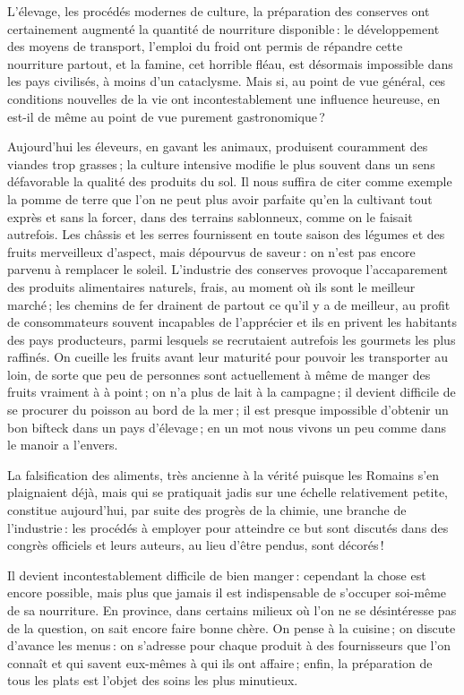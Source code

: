 L'élevage, les procédés modernes de culture, la préparation des conserves ont
certainement augmenté la quantité de nourriture disponible : le développement
des moyens de transport, l'emploi du froid ont permis de répandre cette
nourriture partout, et la famine, cet horrible fléau, est désormais impossible
dans les pays civilisés, à moins d'un cataclysme. Mais si, au point de vue
général, ces conditions nouvelles de la vie ont incontestablement une influence
heureuse, en est-il de même au point de vue purement gastronomique ?

Aujourd'hui les éleveurs, en gavant les animaux, produisent couramment des
viandes trop grasses ; la culture intensive modifie le plus souvent dans un
sens défavorable la qualité des produits du sol. Il nous suffira de citer comme
exemple la pomme de terre que l'on ne peut plus avoir parfaite qu'en la
cultivant tout exprès et sans la forcer, dans des terrains sablonneux, comme on
le faisait autrefois. Les châssis et les serres fournissent en toute saison des
légumes et des fruits merveilleux d'aspect, mais dépourvus de saveur : on n'est
pas encore parvenu à remplacer le soleil. L'industrie des conserves provoque
l'accaparement des produits alimentaires naturels, frais, au moment où ils sont
le meilleur marché ; les chemins de fer drainent de partout ce qu'il y a de
meilleur, au profit de consommateurs souvent incapables de l'apprécier et ils
en privent les habitants des pays producteurs, parmi lesquels se recrutaient
autrefois les gourmets les plus raffinés. On cueille les fruits avant leur
maturité pour pouvoir les transporter au loin, de sorte que peu de personnes
sont actuellement à même de manger des fruits vraiment à à point ; on n'a plus
de lait à la campagne ; il devient difficile de se procurer du poisson au bord
de la mer ; il est presque impossible d'obtenir un bon bifteck dans un pays
d'élevage ; en un mot nous vivons un peu comme dans le manoir a l'envers.

La falsification des aliments, très ancienne à la vérité puisque les Romains
s'en plaignaient déjà, mais qui se pratiquait jadis sur une échelle
relativement petite, constitue aujourd'hui, par suite des progrès de la chimie,
une branche de l'industrie : les procédés à employer pour atteindre ce but sont
discutés dans des congrès officiels et leurs auteurs, au lieu d'être pendus,
sont décorés !

Il devient incontestablement difficile de bien manger : cependant la chose est
encore possible, mais plus que jamais il est indispensable de s'occuper
soi-même de sa nourriture. En province, dans certains milieux où l’on ne se
désintéresse pas de la question, on sait encore faire bonne chère. On pense
à la cuisine ; on discute d'avance les menus : on s'adresse pour chaque produit
à des fournisseurs que l’on connaît et qui savent eux-mêmes à qui ils ont
affaire ; enfin, la préparation de tous les plats est l'objet des soins les
plus minutieux.

